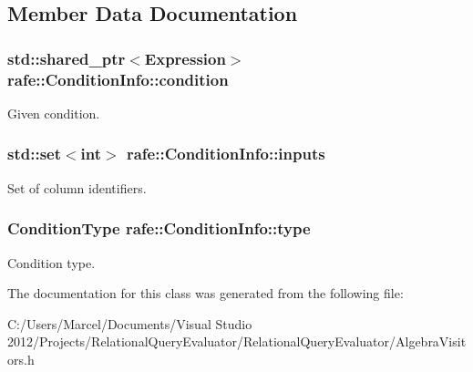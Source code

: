 \subsection{Member Data Documentation}
\hypertarget{classrafe_1_1_condition_info_aa64e9e78cfbd31a51647f9bdca6feb76}{
\subsubsection[{condition}]{\setlength{\rightskip}{0pt plus 5cm}std\+::shared\+\_\+ptr$<${\bf Expression}$>$ rafe\+::\+Condition\+Info\+::condition}}\label{classrafe_1_1_condition_info_aa64e9e78cfbd31a51647f9bdca6feb76}
Given condition. \hypertarget{classrafe_1_1_condition_info_ab84980884b8f58e451054b22401eae41}{
\subsubsection[{inputs}]{\setlength{\rightskip}{0pt plus 5cm}std\+::set$<$int$>$ rafe\+::\+Condition\+Info\+::inputs}}\label{classrafe_1_1_condition_info_ab84980884b8f58e451054b22401eae41}
Set of column identifiers. \hypertarget{classrafe_1_1_condition_info_a6145e30ff335f025f1a1bfa89005c1c2}{
\subsubsection[{type}]{\setlength{\rightskip}{0pt plus 5cm}Condition\+Type rafe\+::\+Condition\+Info\+::type}}\label{classrafe_1_1_condition_info_a6145e30ff335f025f1a1bfa89005c1c2}
Condition type. 

The documentation for this class was generated from the following file\+:\begin{DoxyCompactItemize}
\item 
C\+:/\+Users/\+Marcel/\+Documents/\+Visual Studio 2012/\+Projects/\+Relational\+Query\+Evaluator/\+Relational\+Query\+Evaluator/Algebra\+Visitors.\+h\end{DoxyCompactItemize}
